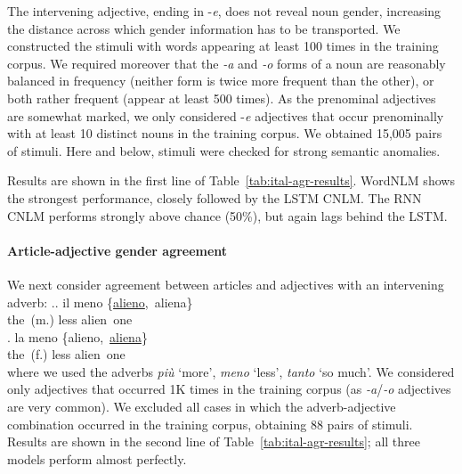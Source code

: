The intervening adjective, ending in -\emph{e}, does not reveal
noun gender, increasing the distance across which gender information
has to be transported. We constructed the stimuli with words appearing
at least 100 times in the training corpus. We required moreover that
the \emph{-a} and \emph{-o} forms of a noun are reasonably balanced in
frequency (neither form is twice more frequent than the other), or
both rather frequent (appear at least 500 times). As the prenominal
adjectives are somewhat marked, we only considered -\emph{e}
adjectives that occur prenominally with at least 10 distinct nouns in
the training corpus. We obtained 15,005 pairs of stimuli.  Here and
below, stimuli were checked for strong semantic anomalies. %

Results are shown in the first line of
Table~\ref{tab:ital-agr-results}.  WordNLM shows the strongest
performance, closely followed by the LSTM CNLM.  The RNN CNLM
performs strongly above chance (50\%), but again lags behind the LSTM.

\paragraph{Article-adjective gender agreement}
We next consider agreement between articles and adjectives with an intervening adverb:
\ex.\ag. il meno \{\underline{alieno},\ aliena\} \\
the\ (m.) less alien\ one \\
\bg. la meno \{alieno,\ \underline{aliena}\} \\
the\ (f.) less alien\ one \\

where we used the adverbs \emph{pi{\`u}} `more', \emph{meno} `less',
\emph{tanto} `so much'. We considered only adjectives that occurred 1K
times in the training corpus (as \emph{-a}/\emph{-o} adjectives are
very common). We excluded all cases in which the
adverb-adjective combination occurred in the training corpus, obtaining 88 pairs of stimuli. %
Results are shown in the second line of Table~\ref{tab:ital-agr-results}; all three models perform almost perfectly.

